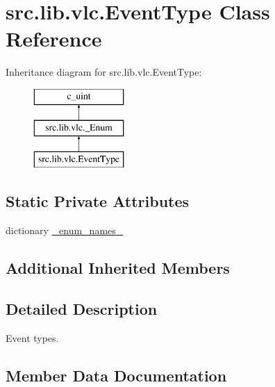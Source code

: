 \hypertarget{classsrc_1_1lib_1_1vlc_1_1EventType}{}\section{src.\+lib.\+vlc.\+Event\+Type Class Reference}
\label{classsrc_1_1lib_1_1vlc_1_1EventType}
Inheritance diagram for src.\+lib.\+vlc.\+Event\+Type\+:\begin{figure}[H]
\begin{center}
\leavevmode
\includegraphics[height=3.000000cm]{classsrc_1_1lib_1_1vlc_1_1EventType}
\end{center}
\end{figure}
\subsection*{Static Private Attributes}
\begin{DoxyCompactItemize}
\item 
dictionary \hyperlink{classsrc_1_1lib_1_1vlc_1_1EventType_a91ba07bdc81b31c96003ce137c162764}{\+\_\+enum\+\_\+names\+\_\+}
\end{DoxyCompactItemize}
\subsection*{Additional Inherited Members}


\subsection{Detailed Description}
\begin{DoxyVerb}Event types.
\end{DoxyVerb}
 

\subsection{Member Data Documentation}
\hypertarget{classsrc_1_1lib_1_1vlc_1_1EventType_a91ba07bdc81b31c96003ce137c162764}{}
